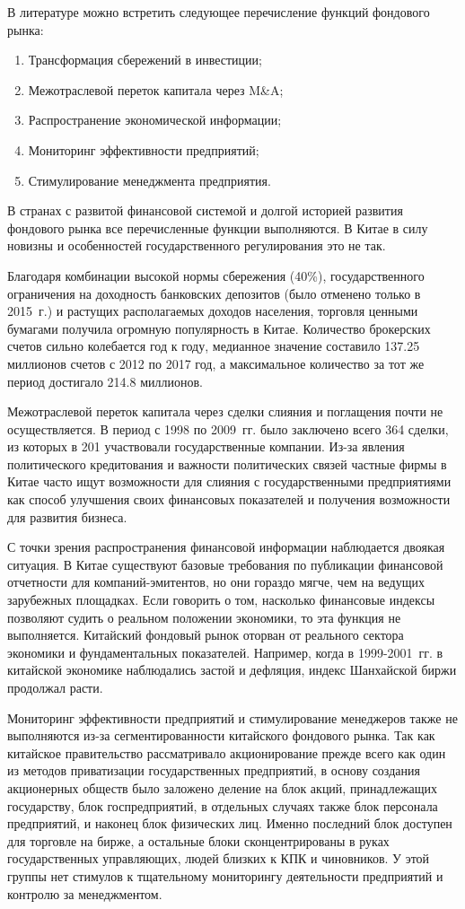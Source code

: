 \documentclass[a4paper,12pt]{article}
\begin{document}
В литературе можно встретить следующее перечисление функций фондового рынка:
\begin{enumerate}
  \item Трансформация сбережений в инвестиции;
  \item Межотраслевой переток капитала через M\&A;
  \item Распространение экономической информации;
  \item Мониторинг эффективности предприятий;
  \item Стимулирование менеджмента предприятия.
\end{enumerate}

В странах с развитой финансовой системой и долгой историей развития фондового рынка все перечисленные функции выполняются. В Китае в силу новизны и особенностей государственного регулирования это не так.

Благодаря комбинации высокой нормы сбережения (40\%), государственного ограничения на доходность банковских депозитов (было отменено только в 2015~г.) и растущих располагаемых доходов населения, торговля ценными бумагами получила огромную популярность в Китае. Количество брокерских счетов сильно колебается год к году, медианное значение составило 137.25 миллионов счетов с 2012 по 2017 год, а максимальное количество за тот же период достигало 214.8 миллионов.

Межотраслевой переток капитала через сделки слияния и поглащения почти не осуществляется. В период с 1998 по 2009~гг. было заключено всего 364 сделки, из которых в 201 участвовали государственные компании. Из-за явления политического кредитования и важности политических связей частные фирмы в Китае часто ищут возможности для слияния с государственными предприятиями как способ улучшения своих финансовых показателей и получения возможности для развития бизнеса.

С точки зрения распространения финансовой информации наблюдается двоякая ситуация. В Китае существуют базовые требования по публикации финансовой отчетности для компаний-эмитентов, но они гораздо мягче, чем на ведущих зарубежных площадках. Если говорить о том, насколько финансовые индексы позволяют судить о реальном положении экономики, то эта функция не выполняется. Китайский фондовый рынок оторван от реального сектора экономики и фундаментальных показателей. Например, когда в 1999-2001~гг. в китайской экономике наблюдались застой и дефляция, индекс Шанхайской биржи продолжал расти.

Мониторинг эффективности предприятий и стимулирование менеджеров также не выполняются из-за сегментированности китайского фондового рынка. Так как китайское правительство рассматривало акционирование прежде всего как один из методов приватизации государственных предприятий, в основу создания акционерных обществ было заложено деление на блок акций, принадлежащих государству, блок госпредприятий, в отдельных случаях также блок персонала предприятий, и наконец блок физических лиц. Именно последний блок доступен для торговле на бирже, а остальные блоки сконцентрированы в руках государственных управляющих, людей близких к КПК и чиновников. У этой группы нет стимулов к тщательному мониторингу деятельности предприятий и контролю за менеджментом.
\end{document}
